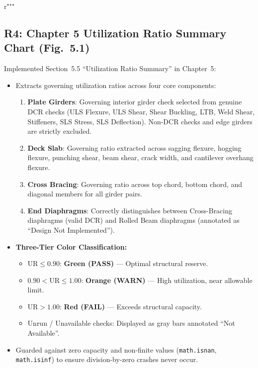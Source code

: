 r"""\documentclass[11pt,a4paper]{article}
\begin{document}
\subsection{R4: Chapter 5 Utilization Ratio Summary Chart (Fig.~5.1)}
Implemented Section~5.5 ``Utilization Ratio Summary'' in Chapter~5:
\begin{itemize}
    \item Extracts governing utilization ratios across four core components:
    \begin{enumerate}
        \item \textbf{Plate Girders}: Governing interior girder check selected from genuine DCR checks (ULS Flexure, ULS Shear, Shear Buckling, LTB, Weld Shear, Stiffeners, SLS Stress, SLS Deflection). Non-DCR checks and edge girders are strictly excluded.
        \item \textbf{Deck Slab}: Governing ratio extracted across sagging flexure, hogging flexure, punching shear, beam shear, crack width, and cantilever overhang flexure.
        \item \textbf{Cross Bracing}: Governing ratio across top chord, bottom chord, and diagonal members for all girder pairs.
        \item \textbf{End Diaphragms}: Correctly distinguishes between Cross-Bracing diaphragms (valid DCR) and Rolled Beam diaphragms (annotated as ``Design Not Implemented'').
    \end{enumerate}
    \item \textbf{Three-Tier Color Classification:}
    \begin{itemize}
        \item $\text{UR} \le 0.90$: \textbf{Green (PASS)} --- Optimal structural reserve.
        \item $0.90 < \text{UR} \le 1.00$: \textbf{Orange (WARN)} --- High utilization, near allowable limit.
        \item $\text{UR} > 1.00$: \textbf{Red (FAIL)} --- Exceeds structural capacity.
        \item Unrun / Unavailable checks: Displayed as gray bars annotated ``Not Available''.
    \end{itemize}
    \item Guarded against zero capacity and non-finite values (\texttt{math.isnan}, \texttt{math.isinf}) to ensure division-by-zero crashes never occur.
\end{itemize}
\end{document}
